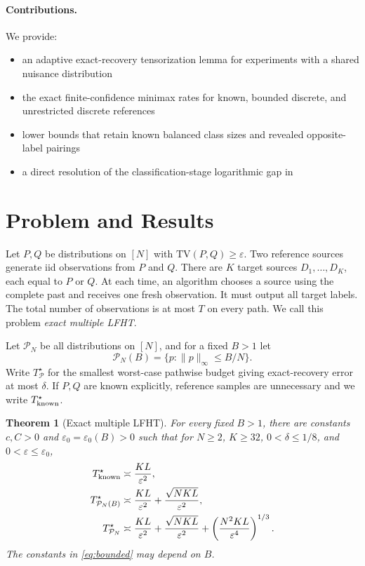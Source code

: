 \documentclass[twoside]{article}
\newtheorem{theorem}{Theorem}
\newcommand{\TV}{\mathrm{TV}}
\newcommand{\cP}{\mathcal P}
\begin{document}
\paragraph{Contributions.} We provide:
\begin{itemize}
\item an adaptive exact-recovery tensorization lemma for experiments with a shared nuisance distribution
\item the exact finite-confidence minimax rates for known, bounded discrete, and unrestricted discrete references
\item lower bounds that retain known balanced class sizes and revealed opposite-label pairings
\item a direct resolution of the classification-stage logarithmic gap in \citet{kumar2026clustering}
\end{itemize}

\section{Problem and Results}

Let $P,Q$ be distributions on $[N]$ with $\TV(P,Q)\geq\varepsilon$. Two reference sources generate iid observations from $P$ and $Q$. There are $K$ target sources $D_1,\ldots,D_K$, each equal to $P$ or $Q$. At each time, an algorithm chooses a source using the complete past and receives one fresh observation. It must output all target labels. The total number of observations is at most $T$ on every path. We call this problem \emph{exact multiple LFHT}.

Let $\cP_N$ be all distributions on $[N]$, and for a fixed $B>1$ let
\[
\cP_N(B)=\{p:\|p\|_\infty\leq B/N\}.
\]
Write $T^\star_{\cP}$ for the smallest worst-case pathwise budget giving exact-recovery error at most $\delta$. If $P,Q$ are known explicitly, reference samples are unnecessary and we write $T^\star_{\rm known}$.

\begin{theorem}[Exact multiple LFHT]
\label{thm:main}
For every fixed $B>1$, there are constants $c,C>0$ and $\varepsilon_0=\varepsilon_0(B)>0$ such that for $N\geq2$, $K\geq32$, $0<\delta\leq1/8$, and $0<\varepsilon\leq\varepsilon_0$,
\begin{align}
T^\star_{\rm known}
&\asymp \frac{KL}{\varepsilon^2},
\label{eq:known}\\
T^\star_{\cP_N(B)}
&\asymp \frac{KL}{\varepsilon^2}
+\frac{\sqrt{NKL}}{\varepsilon^2},
\label{eq:bounded}\\
T^\star_{\cP_N}
&\asymp \frac{KL}{\varepsilon^2}
+\frac{\sqrt{NKL}}{\varepsilon^2}
+\left(\frac{N^2KL}{\varepsilon^4}\right)^{1/3}.
\label{eq:arbitrary}
\end{align}
The constants in \eqref{eq:bounded} may depend on $B$.
\end{theorem}
\end{document}

